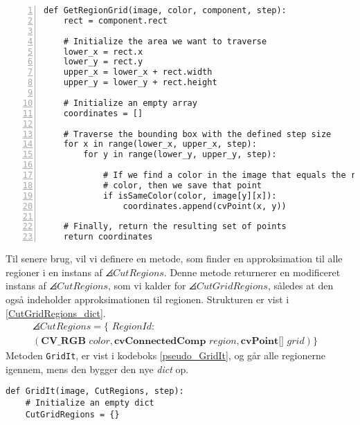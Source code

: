 {\begin{lstlisting}[caption={Metode til at approksimere en regions
    form. Bemærk linje 19, hvor der ses et eksempel på det omvendte
    koordinatsystem i \emph{OpenCV}.}, captionpos=b,
    label={pseudo_GetRegionGrid}, frame=tb,
    breaklines=false, float, numbers=left]
def GetRegionGrid(image, color, component, step):
    rect = component.rect

    # Initialize the area we want to traverse
    lower_x = rect.x
    lower_y = rect.y
    upper_x = lower_x + rect.width
    upper_y = lower_y + rect.height

    # Initialize an empty array
    coordinates = []

    # Traverse the bounding box with the defined step size
    for x in range(lower_x, upper_x, step):
        for y in range(lower_y, upper_y, step):

            # If we find a color in the image that equals the region
            # color, then we save that point
            if isSameColor(color, image[y][x]):
                coordinates.append(cvPoint(x, y))

    # Finally, return the resulting set of points
    return coordinates
\end{lstlisting}
Til senere brug, vil vi definere en metode, som finder en approksimation
til alle regioner i en instans af $\angles{CutRegions}$. Denne metode
returnerer en modificeret instans af $\angles{CutRegions}$, som vi
kalder for $\angles{CutGridRegions}$, således at den også indeholder
approksimationen til regionen. Strukturen er vist i
\eqref{CutGridRegions_dict}.
\begin{multline}
    \angles{CutRegions} = \{ \textit{~RegionId} : \\
    (\textbf{CV\_RGB~}\textit{color}, \textbf{cvConnectedComp~}\textit{region}, \textbf{cvPoint[]~}\textit{grid}) \}\quad
    \label{CutGridRegions_dict}
\end{multline}
Metoden \texttt{GridIt}, er vist i kodeboks \ref{pseudo_GridIt}, og går
alle regionerne igennem, mens den bygger den nye \emph{dict} op.

\begin{lstlisting}[caption={Metode, som finder approksimationen til alle
    regioner i en instans af $\angles{CutRegions}$.}, captionpos=b,
    label={pseudo_GridIt}, frame=tb,
    breaklines=false, float]
def GridIt(image, CutRegions, step):
    # Initialize an empty dict
    CutGridRegions = {}


\end{lstlisting}}
